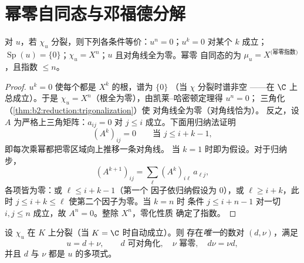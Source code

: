 \section{幂零自同态与邓福德分解}

\begin{proposition}[幂零自同态]\label{prop:b2:reduction:nilpotent}
对 $u$，若 $\chi_u$ 分裂，则下列各条件等价：$u^n =
0$；$u^k = 0$ 对某个 $k$ 成立；$\operatorname{Sp}(u) = \{0\}$；$\chi_u
= X^n$；$u$ 且对角线全为零。幂零
自同态的为 $\mu_u = X^{\text{(幂零指数)}}$，且指数
$\leq n$。
\end{proposition}

\begin{proof}
$u^k = 0$ 使每个都是 $X^k$ 的根，谱为 $\{0\}$
（当 $\chi$ 分裂时谱非空 ——在 $\C$ 上总成立）。于是 $\chi_u =
X^n$（根全为零），由凯莱–哈密顿定理得 $u^n = 0$；
三角化（\cref{thm:b2:reduction:trigonalization}）使
对角线全为零（对角线恰为）。
反之，设 $A$ 为严格上三角矩阵：$a_{ij} = 0$
对 $j \leq i$ 成立。下面用归纳法证明
\[
(A^k)_{ij} = 0 \qquad \text{当 } j \leq i + k - 1,
\]
即每次乘幂都把零区域向上推移一条对角线。
当 $k = 1$ 时即为假设。对于归纳步，
\[
(A^{k+1})_{ij} = \sum_{\ell} (A^k)_{i\ell}\,a_{\ell j} ,
\]
各项皆为零：或 $\ell \leq i + k - 1$（第一个
因子依归纳假设为 $0$），或 $\ell \geq i + k$，此时
$j \leq i + k \leq \ell$ 使第二个因子为零。当 $k = n$ 时
条件 $j \leq i + n - 1$ 对一切 $i, j \leq n$ 成立，故 $A^n =
0$。整除 $X^n$，零化性质
确定了指数。
\end{proof}

\begin{theorem}[邓福德分解]\label{thm:b2:reduction:dunford}
设 $\chi_u$ 在 $K$ 上分裂（当 $K = \C$ 时自动成立）。则
存在\emph{唯一}的数对 $(d, \nu)$，满足
\[
u = d + \nu, \qquad d \text{ 可对角化}, \quad \nu
\text{ 幂零}, \quad d\nu = \nu d ,
\]
并且 $d$ 与 $\nu$ 都是
$u$ 的多项式。
\end{theorem}

